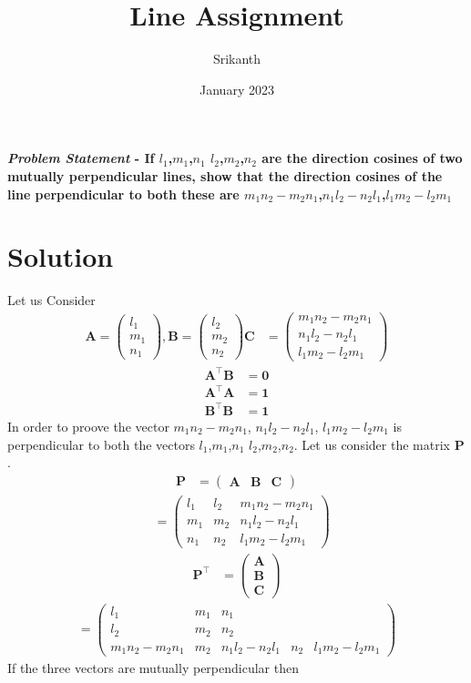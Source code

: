 \documentclass[12pt]{article}
\title{\textbf{Line Assignment}}
\author{Srikanth}
\date{January 2023}
\let\vec\mathbf
\newcommand{\myvec}[1]{\ensuremath{\begin{pmatrix}#1\end{pmatrix}}}
\begin{document}
\maketitle
\paragraph{\textit{Problem Statement} - If $l_1$,$m_1$,$n_1$  $l_2$,$m_2$,$n_2$ are the direction cosines of two mutually perpendicular lines, show that the direction cosines of the line perpendicular to both these are  $m_1n_2-m_2n_1$,$n_1l_2-n_2l_1$,$l_1m_2-l_2m_1$}
\section*{Solution}
Let us Consider
\begin{align}
 \vec{A}=\myvec{l_1\\m_1\\n_1},\vec{B}=\myvec{l_2\\m_2\\n_2}
 \vec{C}&=\myvec{m_1n_2-m_2n_1\\n_1l_2-n_2l_1\\l_1m_2-l_2m_1}
 \end{align}
 \begin{align} 
 \vec{A}^{\top}\vec{B}&=\vec{0} \\
  \vec{A}^{\top}\vec{A}&=\vec{1}\\
   \vec{B}^{\top}\vec{B}&=\vec{1} 
 \end{align}
In order to proove the vector  $m_1n_2-m_2n_1$, $n_1l_2-n_2l_1$, $l_1m_2-l_2m_1$ is perpendicular to both the vectors $l_1$,$m_1$,$n_1$  $l_2$,$m_2$,$n_2$. Let us consider the matrix $\vec{P}$.
\begin{align}
\vec{P}&=\myvec{\vec{A} & \vec{B} & \vec{C}}
\end{align}
\begin{align}
&=\begin{pmatrix}
l_1&l_2&m_1n_2-m_2n_1\\
        m_1&m_2&n_1l_2-n_2l_1\\
        n_1&n_2&l_1m_2-l_2m_1
	\end{pmatrix}
	\end{align}
	\begin{align}	
	\vec{P}^{\top} &= \myvec{\vec{A}\\\vec{B}\\\vec{C}}
	\end{align}
\begin{align}
=\begin{pmatrix}
l_1&m_1&n_1\\
l_2&m_2&n_2\\
m_1n_2-m_2n_1&m_2&n_1l_2-n_2l_1&n_2&l_1m_2-l_2m_1
\end{pmatrix}	
	\end{align}
	If the three vectors are mutually perpendicular then
	
\end{document}
